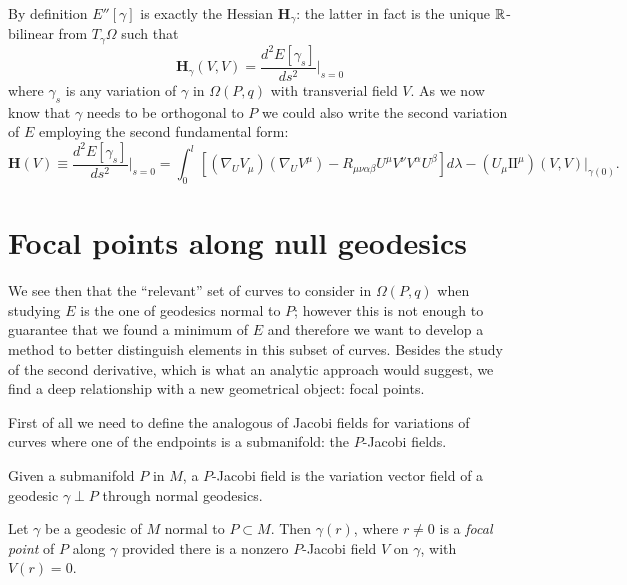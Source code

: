 By definition \(E''[\gamma]\) is exactly the Hessian \(\textbf{H}_{\gamma}\): the latter in fact is the unique \({\mathbb{R}}\)-bilinear from \(T_{\gamma}\Omega\) such that 
\[
\textbf{H}_{\gamma}(V, V) = \frac{d^2E[\gamma_s]}{ds^2}\Big\vert_{s = 0}
\]
where \(\gamma_s\) is any variation of \(\gamma\) in \(\Omega(P, q)\) with transverial field \(V\).
As we now know that \(\gamma\) needs to be orthogonal to \(P\) we could also write the second variation of \(E\) employing the second fundamental form:
\begin{equation}
	\label{eq:hessian}
	\textbf{H}(V) \equiv\frac{d^2E[\gamma_s]}{ds^2}\Big\vert_{s = 0} = 
	\int_{0}^{l} \left[(\nabla_UV_{\mu})(\nabla_UV^{\mu}) - R_{\mu\nu\alpha\beta}U^{\mu}V^{\nu}V^{\alpha}U^{\beta}\right] d\lambda - (U_{\mu}\mathrm{I\!I}^{\mu})(V, V)\Big\vert_{\gamma(0)}.
\end{equation}

\section{Focal points along null geodesics}
We see then that the ``relevant'' set of curves to consider in \(\Omega(P, q)\) when studying \(E\) is the one of geodesics normal to \(P\); however this is not enough to guarantee that we found a minimum of \(E\) and therefore we want to develop a method to better distinguish elements in this subset of curves. Besides the study of the second derivative, which is what an analytic approach would suggest, we find a deep relationship with a new geometrical object: focal points.

\vskip 4pt

First of all we need to define the analogous of Jacobi fields for variations of curves where one of the endpoints is a submanifold: the \(P\)-Jacobi fields.
\begin{definition}
	Given a submanifold \(P\) in \(M\), a \(P\)-Jacobi field is the variation vector field of a geodesic \(\gamma \perp P\) through normal geodesics.
\end{definition}


\begin{definition}
	Let \(\gamma\) be a geodesic of \(M\) normal to \(P \subset M\). Then \(\gamma(r)\), where \(r \neq 0\) is a \emph{focal point} of \(P\) along \(\gamma\) provided there is a nonzero \(P\)-Jacobi field \(V\) on \(\gamma\), with \(V(r) = 0\).
\end{definition}

